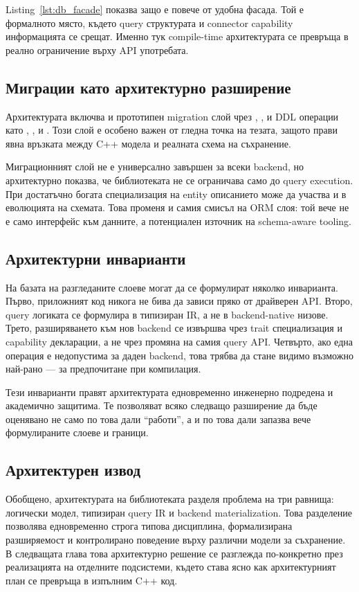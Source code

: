 Listing~\ref{lst:db_facade} показва защо  е повече от удобна фасада. Той е формалното място, където query структурата и connector capability информацията се срещат. Именно тук compile-time архитектурата се превръща в реално ограничение върху API употребата.

\subsection{Миграции като архитектурно разширение}

Архитектурата включва и прототипен migration слой чрез , ,  и DDL операции като , ,  и . Този слой е особено важен от гледна точка на тезата, защото прави явна връзката между C++ модела и реалната схема на съхранение.

Миграционният слой не е универсално завършен за всеки backend, но архитектурно показва, че библиотеката не се ограничава само до query execution. При достатъчно богата специализация на  entity описанието може да участва и в еволюцията на схемата. Това променя и самия смисъл на ORM слоя: той вече не е само интерфейс към данните, а потенциален източник на schema-aware tooling.

\subsection{Архитектурни инварианти}

На базата на разгледаните слоеве могат да се формулират няколко инварианта. Първо, приложният код никога не бива да зависи пряко от драйверен API. Второ, query логиката се формулира в типизиран IR, а не в backend-native низове. Трето, разширяването към нов backend се извършва чрез trait специализация и capability декларации, а не чрез промяна на самия query API. Четвърто, ако една операция е недопустима за даден backend, това трябва да стане видимо възможно най-рано --- за предпочитане при компилация.

Тези инварианти правят архитектурата едновременно инженерно подредена и академично защитима. Те позволяват всяко следващо разширение да бъде оценявано не само по това дали ``работи'', а и по това дали запазва вече формулираните слоеве и граници.

\subsection{Архитектурен извод}

Обобщено, архитектурата на библиотеката разделя проблема на три равнища: логически модел, типизиран query IR и backend materialization. Това разделение позволява едновременно строга типова дисциплина, формализирана разширяемост и контролирано поведение върху различни модели за съхранение. В следващата глава това архитектурно решение се разглежда по-конкретно през реализацията на отделните подсистеми, където става ясно как архитектурният план се превръща в изпълним C++ код.
